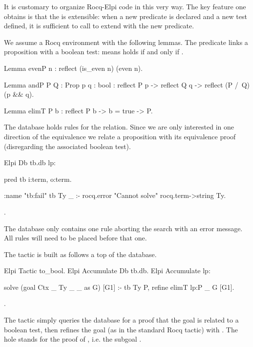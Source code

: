 \documentclass[a4paper, 11pt]{book}
\begin{document}
It is customary to organize Rocq-Elpi code in this very way. The key feature
one obtains is that the  is extensible: when a new
predicate is declared and a new test defined, it is sufficient to call
 to extend  with the new
predicate.

We assume a Rocq environment with the following lemmas. The 
predicate links a proposition with a boolean test: 
means  holds if and only if .

\begin{rocqcode}
Lemma evenP n : reflect (is_even n) (even n).

Lemma andP  {P Q : Prop} {p q : bool} :
  reflect P p -> reflect Q q -> reflect (P /\ Q) (p && q).

Lemma elimT {P b} :
  reflect P b -> b = true -> P.
\end{rocqcode}

The database holds rules for the  relation. Since
we are only interested in one direction of the equivalence we
relate a proposition with its equivalence proof (disregarding the
associated boolean test).

\begin{rocqcode}
Elpi Db tb.db lp:{{

pred tb i:term, o:term.

:name "tb:fail"
tb Ty _ :- rocq.error "Cannot solve" {rocq.term->string Ty}.

}}.
\end{rocqcode}

The database only contains one rule aborting the search with an error message.
All rules will need to be placed before that one.

The  tactic is built as follows a top of the
database.

\begin{rocqcode}
Elpi Tactic to_bool.
Elpi Accumulate Db tb.db.
Elpi Accumulate lp:{{

solve (goal Ctx _ Ty _ _ as G) [G1] :-
  tb Ty P,
  refine {{ elimT lp:P _ }} G [G1].

}}.
\end{rocqcode}

The tactic simply queries the database for a proof  that
the goal is related to a boolean test, then refines the goal (as in the
standard Rocq  tactic) with .
The hole stands for the proof of , i.e. the subgoal
.
\end{document}
